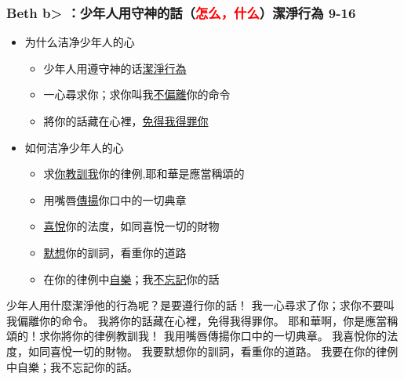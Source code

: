 \subsubsection{Beth \<b> ：少年人用守神的話（\textcolor{red}{怎么，什么}）潔淨行為 9-16}
\begin{itemize}
\itemsep-.45em
\item 为什么洁净少年人的心
\begin{itemize}
\itemsep-.45em
\item 少年人用遵守神的话\underline{潔淨行為}
\item 一心尋求你；求你叫我\underline{不偏離}你的命令
\item 將你的話藏在心裡，\underline{免得我得罪你}
\end{itemize}
\item 如何洁净少年人的心
\begin{itemize}
\itemsep-.45em
\item 求\underline{你教訓我}你的律例,耶和華是應當稱頌的
\item 用嘴唇\underline{傳揚}你口中的一切典章
\item \underline{喜悅}你的法度，如同喜悅一切的財物
\item \underline{默想}你的訓詞，看重你的道路
\item 在你的律例中\underline{自樂}；我\underline{不忘記}你的話
\end{itemize}
\end{itemize}
少年人用什麼潔淨他的行為呢？是要遵行你的話！
我一心尋求了你；求你不要叫我偏離你的命令。
我將你的話藏在心裡，免得我得罪你。
耶和華啊，你是應當稱頌的！求你將你的律例教訓我！
我用嘴唇傳揚你口中的一切典章。
我喜悅你的法度，如同喜悅一切的財物。
我要默想你的訓詞，看重你的道路。
我要在你的律例中自樂；我不忘記你的話。

